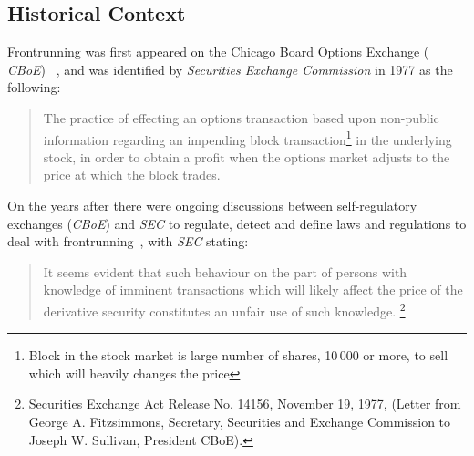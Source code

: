 

\subsection{Historical Context}
Frontrunning was first appeared on the Chicago Board Options Exchange ( \textit{CBoE}) ~\cite{markham1988front}, and was identified by \textit{Securities Exchange Commission} in 1977 as the following:
\begin{quote}
The practice of effecting an options transaction based upon non-public information regarding an impending block transaction\footnote{Block in the stock market is large number of shares, 10\,000 or more, to sell which will heavily changes the price} in the underlying stock, in order to obtain a profit when the options market adjusts to the price at which the block trades. ~\cite{sec1978optionsmarket}
\end{quote} 



On the years after there were ongoing discussions between self-regulatory exchanges (\eg \textit{CBoE}) and  \textit{SEC} to regulate, detect and define laws and regulations to deal with frontrunning~\cite{markham1988front}, with \textit{SEC} stating: 
\begin{quote}
It seems evident that such behaviour on the part of persons with knowledge of imminent transactions which will likely affect the price of the derivative security constitutes an unfair use of such knowledge. \footnote{Securities Exchange Act Release No. 14156, November 19, 1977, (Letter from George A. Fitzsimmons, Secretary, Securities and Exchange Commission to Joseph W. Sullivan, President  CBoE).}
\end{quote} 

